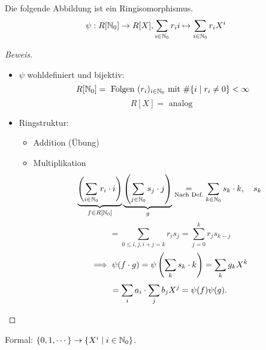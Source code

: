 \documentclass[a4paper]{report}
\begin{document}
\begin{prop}
  Die folgende Abbildung ist ein Ringisomorphismus.
  \[\psi : R[\mathbb{N}_0] \to R[X], \sum_{i \in \mathbb{N}_0} r_{i}i \mapsto \sum_{i \in \mathbb{N}_0}r_{i}X^{i}\]
  \begin{proof}[Beweis]\item
    \begin{itemize}
      \item $\psi$ wohldefiniert und bijektiv:
            \[R[\mathbb{N}_0] = \text{ Folgen } (r_{i})_{i \in \mathbb{N}_0} \text{ mit } \#\{i \mid r_{i} \ne 0\} < \infty\]
            \[R[X] = \text{ analog }\]
      \item Ringstruktur:
            \begin{itemize}
              \item Addition (Übung)
              \item Multiplikation
                    \[\underbrace{\left(\sum_{i \in \mathbb{N}_0} r_{i}\cdot i\right)}_{f \in R[\mathbb{N}_0]}\underbrace{\left(\sum_{j \in \mathbb{N}_0} s_{j}\cdot j\right)}_{g} \underset{\text{Nach Def.}}= \sum_{k \in \mathbb{N}_0} s_{k}\cdot k, \quad s_{k}\]
                    \[= \sum_{0 \le i,j, i+j = k}r_{i}s_{j} = \sum_{j=0}^{k}r_{j}s_{k-j}\]
                    \[\implies \psi(f \cdot g) = \psi\left(\sum_{k} s_{k}\cdot k\right) = \sum_{k}g_kX^{k}\]
                    \[ = \sum_{i}a_{i}\cdot  \sum_{j}b_{j}X^{j} = \psi(f)\psi(g).\qedhere\]
            \end{itemize}
    \end{itemize}
  \end{proof}
  Formal: $\{0, 1, \cdots\} \to \{X^{i} \mid i \in \mathbb{N}_0\}$.
\end{prop}
\end{document}
